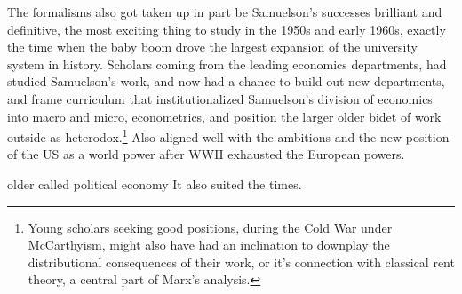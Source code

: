 The formalisms also got taken up in part be
Samuelson's successes brilliant and definitive, the most exciting thing to study in the 1950s and early 1960s, exactly the time when the baby boom drove the largest expansion of the university system in history. Scholars coming from the leading economics departments, had studied Samuelson's work, and now had a chance to build out new departments, and frame curriculum that institutionalized Samuelson's division of economics into macro and micro, econometrics, and position the larger older bidet of work outside as heterodox.\footnote{Young scholars seeking good positions, during the Cold War under McCarthyism, might also have had an inclination to downplay the distributional consequences of their work, or it's connection with classical rent theory, a central part of Marx's analysis.} %
Also aligned well with the ambitions and the new position of the US as a world power after WWII exhausted the European powers.

older called political economy 
It also suited the times.

